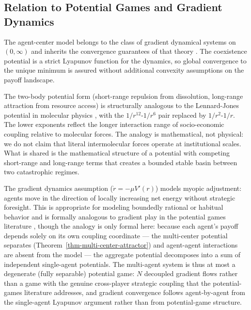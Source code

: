 \documentclass[11pt]{article}
\theoremstyle{plain}
\theoremstyle{definition}
\theoremstyle{remark}
\let\origsubsection\subsection
\renewcommand{\subsection}{\needspace{7\baselineskip}\origsubsection}
\begin{document}
\subsection{Relation to Potential Games and Gradient
Dynamics}\label{relation-to-potential-games-and-gradient-dynamics}

The agent-center model belongs to the class of gradient dynamical
systems on \((0, \infty)\) and inherits the convergence guarantees of
that theory \citep{Strogatz2015, HirschSmaleDevaney2012}. The
coexistence potential is a strict Lyapunov function for the dynamics, so
global convergence to the unique minimum is assured without additional
convexity assumptions on the payoff landscape.

The two-body potential form (short-range repulsion from dissolution,
long-range attraction from resource access) is structurally analogous to
the Lennard-Jones potential in molecular physics \citep{Jones1924}, with
the \(1/r^{12}\)-\(1/r^6\) pair replaced by \(1/r^2\)-\(1/r\). The lower
exponents reflect the longer interaction range of socio-economic
coupling relative to molecular forces. The analogy is mathematical, not
physical: we do not claim that literal intermolecular forces operate at
institutional scales. What is shared is the mathematical structure of a
potential with competing short-range and long-range terms that creates a
bounded stable basin between two catastrophic regimes.

The gradient dynamics assumption (\(\dot{r} = -\mu V'(r)\)) models
myopic adjustment: agents move in the direction of locally increasing
net energy without strategic foresight. This is appropriate for modeling
boundedly rational or habitual behavior and is formally analogous to
gradient play in the potential games literature
\citep{MondererShapley1996, Sandholm2010}, though the analogy is only
formal here: because each agent's payoff depends solely on its own
coupling coordinate --- the multi-center potential separates
(Theorem~\ref{thm-multi-center-attractor}) and agent-agent interactions
are absent from the model --- the aggregate potential decomposes into a
sum of independent single-agent potentials. The multi-agent system is
thus at most a degenerate (fully separable) potential game: \(N\)
decoupled gradient flows rather than a game with the genuine
cross-player strategic coupling that the potential-games literature
addresses, and gradient convergence follows agent-by-agent from the
single-agent Lyapunov argument rather than from potential-game
structure.
\end{document}
